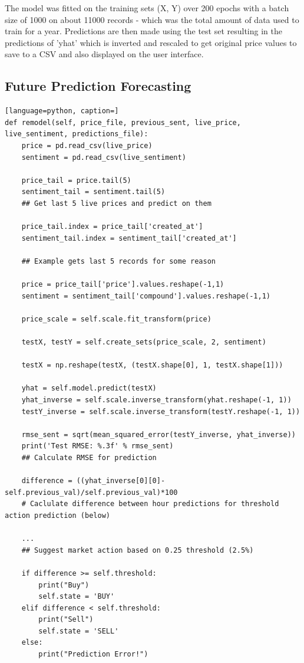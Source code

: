 \documentclass[oneside, 12pt]{article}
\begin{document}
		The model was fitted on the training sets (X, Y) over 200 epochs with a batch size of 1000 on about 11000 records - which was the total amount of data used to train for a year. Predictions are then made using the test set resulting in the predictions of 'yhat' which is inverted and rescaled to get original price values to save to a CSV and also displayed on the user interface.
		
		\subsection{Future Prediction Forecasting}
		
		\begin{lstlisting}[language=python, caption=]
def remodel(self, price_file, previous_sent, live_price, live_sentiment, predictions_file):
	price = pd.read_csv(live_price)
	sentiment = pd.read_csv(live_sentiment)
	
	price_tail = price.tail(5)
	sentiment_tail = sentiment.tail(5)
	## Get last 5 live prices and predict on them
	
	price_tail.index = price_tail['created_at']
	sentiment_tail.index = sentiment_tail['created_at']
	
	## Example gets last 5 records for some reason
	
	price = price_tail['price'].values.reshape(-1,1)
	sentiment = sentiment_tail['compound'].values.reshape(-1,1)
	
	price_scale = self.scale.fit_transform(price)
	
	testX, testY = self.create_sets(price_scale, 2, sentiment)
	
	testX = np.reshape(testX, (testX.shape[0], 1, testX.shape[1]))
	
	yhat = self.model.predict(testX)
	yhat_inverse = self.scale.inverse_transform(yhat.reshape(-1, 1))
	testY_inverse = self.scale.inverse_transform(testY.reshape(-1, 1))
	
	rmse_sent = sqrt(mean_squared_error(testY_inverse, yhat_inverse))
	print('Test RMSE: %.3f' % rmse_sent)
	## Calculate RMSE for prediction
	
	difference = ((yhat_inverse[0][0]-self.previous_val)/self.previous_val)*100
	# Caclulate difference between hour predictions for threshold action prediction (below)
	
	... 
	## Suggest market action based on 0.25 threshold (2.5%)
	
	if difference >= self.threshold:
		print("Buy")
		self.state = 'BUY'
	elif difference < self.threshold:
		print("Sell")
		self.state = 'SELL'
	else:
		print("Prediction Error!")
	

\end{lstlisting}
\end{document}
